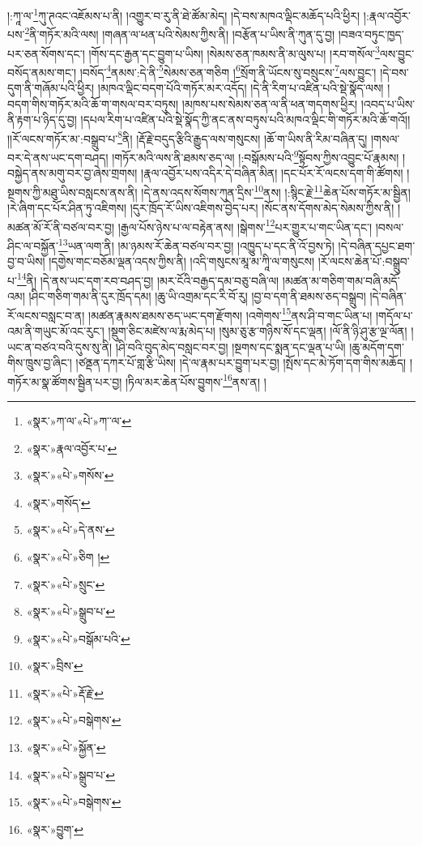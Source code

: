 །:ཀཱ་ལ་\footnote{«སྣར་»ཀ་ལ་«པེ་»ཀ་་ལ་}ཀུ་ཊའང་འཇོམས་པ་ནི། །འགྱུར་བ་རུ་ནི་ཐེ་ཚོམ་མེད། །དེ་བས་མཁའ་ལྡིང་མཆོད་པའི་ཕྱིར། །:རྣལ་འབྱོར་པས་\footnote{«སྣར་»རྣལ་འབྱོར་པ་}ནི་གཏོར་མའི་ལས། །གཞན་ལ་ཕན་པའི་སེམས་ཀྱིས་ནི། །བརྩོན་པ་ཡིས་ནི་ཀུན་དུ་བྱ། །བཟའ་བཏུང་ཁྱད་པར་ཅན་སོགས་དང་། །གོས་དང་རྒྱན་དང་བྱུག་པ་ཡིས། །སེམས་ཅན་ཁམས་ནི་མ་ལུས་པ། །རབ་གསོལ་\footnote{«སྣར་»«པེ་»གསོས་}ལས་བྱུང་བསོད་ནམས་གང་། །བསོད་\footnote{«སྣར་»གསོད་}ནམས་:དེ་ནི་\footnote{«སྣར་»«པེ་»དེ་ནས་}སེམས་ཅན་གཅིག །\footnote{«སྣར་»«པེ་»ཅིག །}སྲོག་ནི་ཡོངས་སུ་བསྲུངས་\footnote{«སྣར་»«པེ་»སྲུང་}ལས་བྱུང་། །དེ་བས་དུག་ནི་གཞོམ་པའི་ཕྱིར། །མཁའ་ལྡིང་བདག་པོའི་གཏོར་མར་འདོད། །དེ་ནི་རིག་པ་འཛིན་པའི་སྡེ་སྣོད་ལས། །
བདག་གིས་གཏོར་མའི་ཆོ་ག་གསལ་བར་བཏུས། །མཁས་པས་སེམས་ཅན་ལ་ནི་ཕན་གདགས་ཕྱིར། །འབད་པ་ཡིས་ནི་རྟག་པ་ཉིད་དུ་བྱ། །དཔལ་རིག་པ་འཛིན་པའི་སྡེ་སྣོད་ཀྱི་ནང་ནས་བཏུས་པའི་མཁའ་ལྡིང་གི་གཏོར་མའི་ཆོ་གའོ།། །།རོ་ལངས་གཏོར་མ་:བསྒྲུབ་པ་\footnote{«སྣར་»«པེ་»སྒྲུབ་པ་}ནི། །རྡོ་རྗེ་བདུད་རྩིའི་རྒྱུད་ལས་གསུངས། །ཆོ་ག་ཡིས་ནི་རིམ་བཞིན་དུ། །གསལ་བར་དེ་ནས་ཡང་དག་བཤད། །གཏོར་མའི་ལས་ནི་ཐམས་ཅད་ལ། །:བསྒོམས་པའི་\footnote{«སྣར་»«པེ་»བསྒོམ་པའི་}སྟོབས་ཀྱིས་འབྱུང་པོ་རྣམས། །བསྐྱེད་ནས་མགུ་བར་བྱ་ཞེས་གྲགས། །རྣལ་འབྱོར་པས་འདིར་དེ་བཞིན་མིན། །དང་པོར་རོ་ལངས་དག་གི་ཚོགས། །སྔགས་ཀྱི་མཐུ་ཡིས་བསླངས་ནས་ནི། །དེ་ནས་འདས་སོགས་ཀུན་དྲིས་\footnote{«སྣར་»བྲིས་}ནས། །:སྙིང་རྗེ་\footnote{«སྣར་»«པེ་»རྡོ་རྗེ་}ཆེན་པོས་གཏོར་མ་སྦྱིན། །རེ་ཞིག་དང་པོར་ཤིན་ཏུ་འཇིགས། །དུར་ཁྲོད་རོ་ཡིས་འཇིགས་བྱེད་པར། །སོང་ནས་དོགས་མེད་སེམས་ཀྱིས་ནི། །མཚན་མོ་རོ་ནི་བཙལ་བར་བྱ། །རྒྱལ་པོས་ཉེས་པ་ལ་བརྟེན་ནས། །སྒེགས་\footnote{«སྣར་»«པེ་»བསྒེགས་}པར་གྱུར་པ་གང་ཡིན་དང་། །བསལ་ཤིང་ལ་བསྐྱོན་\footnote{«སྣར་»«པེ་»སྐྱོན་}ཡན་ལག་ནི། །མ་ཉམས་རོ་ཆེན་བཙལ་བར་བྱ། །འཁྱུད་པ་དང་ནི་འོ་བྱས་ཏེ། །དེ་བཞིན་དཔྱང་ཐག་བྱ་བ་ཡིས། །དགྱེས་གང་བཅོམ་ལྡན་འདས་ཀྱིས་ནི། །འདི་གསུངས་མཱ་མ་ཀཱི་ལ་གསུངས། །རོ་ལངས་ཆེན་པོ་:བསྒྲུབ་པ་\footnote{«སྣར་»«པེ་»སྒྲུབ་པ་}ནི། །དེ་ནས་ཡང་དག་རབ་བཤད་བྱ། །མར་ངོའི་བརྒྱད་དམ་བཅུ་བཞི་ལ། །མཚན་མ་གཅིག་གམ་བཞི་མདོ་འམ། །ཤིང་གཅིག་གམ་ནི་དུར་ཁྲོད་དམ། །ཆུ་ཡི་འགྲམ་དང་རི་བོ་རུ། །བྱ་བ་དག་ནི་ཐམས་ཅད་བསྒྲུབ། །དེ་བཞིན་རོ་ལངས་བསླང་བ་ན། །མཚན་རྣམས་ཐམས་ཅད་ཡང་དག་རྫོགས། །འགེགས་\footnote{«སྣར་»«པེ་»བསྒེགས་}ནས་ཤི་བ་གང་ཡིན་པ། །གདོལ་པ་འམ་ནི་གཡུང་མོ་འང་རུང་། །སྡུག་ཅིང་མཛེས་ལ་རྨ་མེད་པ། །སུམ་ཅུ་རྩ་གཉིས་སོ་དང་ལྡན། །ལོ་ནི་ཉི་ཤུ་རྩ་ལྔ་ལོན། །ཡང་ན་བཙའ་བའི་དུས་སུ་ནི། །ཤི་བའི་བུད་མེད་བསླང་བར་བྱ། །སྔགས་དང་སྨན་དང་ལྡན་པ་ཡི། །ཆུ་མདོག་དག་གིས་ཁྲུས་བྱ་ཞིང་། །ཙནྡན་དཀར་པོ་གླ་རྩི་ཡིས། །དེ་ལ་རྣམ་པར་བྱུག་པར་བྱ། །སྤོས་དང་མེ་ཏོག་དག་གིས་མཆོད། །གཏོར་མ་སྣ་ཚོགས་སྦྱིན་པར་བྱ། །ཏིལ་མར་ཆེན་པོས་བྱུགས་\footnote{«སྣར་»བྱུག་}ནས་ན། །

